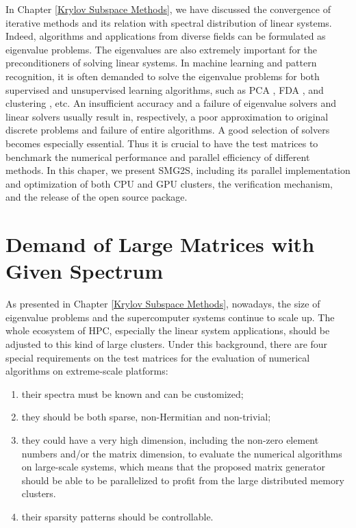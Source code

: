 \begin{displayquote}
	\textsf{In Chapter \ref{Krylov Subspace Methods}, we have discussed the convergence of iterative methods and its relation with spectral distribution of linear systems. Indeed, algorithms and applications from diverse fields can be formulated as eigenvalue problems. The eigenvalues are also extremely important for the preconditioners of solving linear systems. In machine learning and pattern recognition, it is often demanded to solve the eigenvalue problems for both supervised and unsupervised learning algorithms, such as PCA \cite{croux2000principal}, FDA \cite{berkes2005handwritten}, and clustering \cite{fender2017parallel}, etc. An insufficient accuracy and a failure of eigenvalue solvers and linear solvers usually result in, respectively, a poor approximation to original discrete problems and failure of entire algorithms.  A good selection of solvers becomes especially essential. Thus it is crucial to have the test matrices to benchmark the numerical performance and parallel efficiency of different methods. In this chaper, we present SMG2S, including its parallel implementation and optimization of both CPU and GPU clusters, the verification mechanism, and the release of the open source package.}
\end{displayquote}

\vspace{0.6in}

\section{Demand of Large Matrices with Given Spectrum}

As presented in Chapter \ref{Krylov Subspace Methods}, nowadays, the size of eigenvalue problems and the supercomputer systems continue to scale up. The whole ecosystem of HPC, especially the linear system applications, should be adjusted to this kind of large clusters. Under this background, there are four special requirements on the test matrices for the evaluation of numerical algorithms on extreme-scale platforms: 

\begin{enumerate}[label=(\arabic*)]
	\item their spectra must be known and can be customized;
	\item they should be both sparse, non-Hermitian and non-trivial;
	\item they could have a very high dimension, including the non-zero element numbers and/or the matrix dimension, to evaluate the numerical algorithms on large-scale systems, which means that the proposed matrix generator should be able to be parallelized to profit from the large distributed memory clusters.
	\item their sparsity patterns should be controllable.
\end{enumerate}

